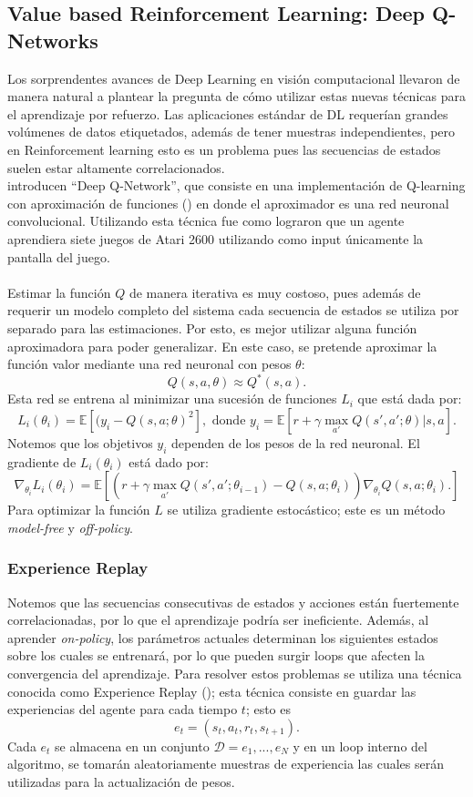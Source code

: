 \documentclass[11pt]{article}
\theoremstyle{plain}
\begin{document}
\subsection{Value based Reinforcement Learning: Deep Q-Networks}
Los sorprendentes avances de Deep Learning en visión computacional llevaron de manera natural a plantear la pregunta de cómo utilizar estas nuevas técnicas para el aprendizaje por refuerzo. 
Las aplicaciones estándar de DL requerían grandes volúmenes de datos etiquetados, además de tener muestras independientes, pero en Reinforcement learning esto es un problema pues las secuencias de estados suelen estar altamente correlacionados.\\
\cite{mnih2013playing} introducen “Deep Q-Network”, que consiste en una implementación de Q-learning con aproximación de funciones (\cite{sutton1998reinforcement}) en donde el aproximador es una red neuronal convolucional. Utilizando esta técnica fue como \cite{mnih2013playing} lograron que un agente aprendiera siete juegos de Atari 2600 utilizando como input únicamente la pantalla del juego. \\
\\
Estimar la función $Q$ de manera iterativa es muy costoso, pues además de requerir un modelo completo del sistema cada secuencia de estados se utiliza por separado para las estimaciones.
Por esto, es mejor utilizar alguna función aproximadora para poder generalizar. En este caso, se pretende aproximar la función valor mediante una red neuronal con pesos $\theta$:
	   \[Q(s,a,\theta) \approx Q^\ast(s,a). \]
Esta red se entrena al minimizar una sucesión de funciones $L_i$ que está dada por:
	   \[ L_i (\theta_i) = \mathbb{E}[(y_i - Q(s,a;\theta)^2], \textrm{ donde  }y_i = \mathbb{E}[r + \gamma \max_{a'} Q(s',a';\theta) | s,a]. \]
Notemos que los objetivos $y_i$ dependen de los pesos de la red neuronal. El gradiente de $L_i (\theta_i)$ está dado por:
	   \[ \nabla_{\theta_i} L_i (\theta_i) = \mathbb{E}[(r + \gamma \max_{a'} Q(s',a';\theta_{i-1}) - Q(s,a;\theta_i)) \nabla_{\theta_i} Q(s,a;\theta_i).] \]
Para optimizar la función $L$ se utiliza gradiente estocástico; este es un método \textit{model-free} y \textit{off-policy}.\\
\subsubsection{Experience Replay}
Notemos que las secuencias consecutivas de estados y acciones están fuertemente correlacionadas, por lo que el aprendizaje podría ser ineficiente. Además, al aprender \textit{on-policy}, los parámetros actuales determinan los siguientes estados sobre los cuales se entrenará, por lo que pueden surgir loops que afecten la convergencia del aprendizaje. 
Para resolver estos problemas se utiliza una técnica conocida como Experience Replay (\cite{Lin1992}); esta técnica consiste en guardar las experiencias del agente para cada tiempo $t$; esto es 
	   \[ e_t = (s_t, a_t, r_t, s_{t+1}). \]
Cada $e_t$ se almacena en un conjunto $\mathcal{D} = e_1 , ... , e_N$ y en un loop interno del algoritmo, se tomarán aleatoriamente muestras de experiencia las cuales serán utilizadas para la actualización de pesos. 
\end{document}
